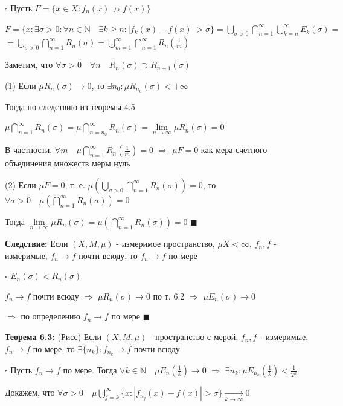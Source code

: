 \documentclass[a4paper]{report}
\begin{document}
\noindent $\square$ Пусть $F=\{x\in X\colon f_n(x)\nrightarrow f(x)\}$

$F=\{x\colon\exists\sigma>0\colon\forall n\in\mathbb N\quad\exists k\ge n\colon|f_k(x)-f(x)|>\sigma\}=\bigcup\limits_{\sigma>0}\bigcap\limits_{n=1}^\infty
\bigcup\limits_{k=n}^\infty E_k(\sigma)=$
$=\bigcup\limits_{\sigma>0}\bigcap\limits_{n=1}^\infty R_n(\sigma)=\bigcup\limits_{m=1}^\infty\bigcap\limits_{n=1}^\infty R_n(\frac1m)$

Заметим, что $\forall\sigma>0\quad\forall n\quad R_n(\sigma)\supset R_{n+1}(\sigma)$

\noindent (1) Если $\mu R_n(\sigma)\to0$, то $\exists n_0\colon\mu R_{n_0}(\sigma)<+\infty$

Тогда по следствию из теоремы 4.5

 $\mu\bigcap\limits_{n=1}^\infty R_n(\sigma)=\mu\bigcap\limits_{n=n_0}^\infty R_n(\sigma)=\lim\limits_{n\to\infty}\mu R_n(\sigma)=0$

В частности, $\forall m\quad\mu\bigcap\limits_{n=1}^\infty R_n(\frac1m)=0$ $\Rightarrow$ $\mu F=0$ как мера счетного объединения множеств меры нуль

\noindent (2) Если $\mu F=0$, т. е. $\mu\left(\bigcup\limits_{\sigma>0}\bigcap\limits_{n=1}^\infty R_n(\sigma)\right)=0$, то $\forall\sigma>0\quad\mu\left(\bigcap\limits_{n=1}^\infty R_n(\sigma)\right)=0$

Тогда $\lim\limits_{n\to\infty}\mu R_n(\sigma)=\mu\left(\bigcap\limits_{n=1}^\infty R_n(\sigma)\right)=0$ $\blacksquare$
\bigskip

\noindent\textbf{Следствие:} Если $(X,M,\mu)$ - измеримое пространство, $\mu X<\infty$, $f_n,f$ - измеримые, $f_n\to f$ почти всюду, то $f_n\to f$ по мере

\noindent $\square$ $E_n(\sigma)<R_n(\sigma)$

$f_n\to f$ почти всюду $\Rightarrow$ $\mu R_n(\sigma)\to0$ по т. 6.2 $\Rightarrow$ $\mu E_n(\sigma)\to0$

$\Rightarrow$ по определению $f_n\to f$ по мере $\blacksquare$
\bigskip

\noindent\textbf{Теорема 6.3:} (Рисс) Если $(X,M,\mu)$ - пространство с мерой, $f_n,f$ - измеримые, $f_n\to f$ по мере, то $\exists\{n_k\}\colon f_{n_k}\to f$ почти всюду

\noindent $\square$ Пусть $f_n\to f$ по мере. Тогда $\forall k\in\mathbb N\quad\mu E_n(\frac1k)\to0$ $\Rightarrow$ $\exists n_k\colon\mu E_{n_k}(\frac1k)<\displaystyle\frac{1}{2^k}$

Докажем, что $\forall\sigma>0\quad\mu\bigcup\limits_{j=k}^\infty\{x\colon|f_{n_j}(x)-f(x)|>\sigma\}\xrightarrow[k\to\infty]{}0$
\end{document}
